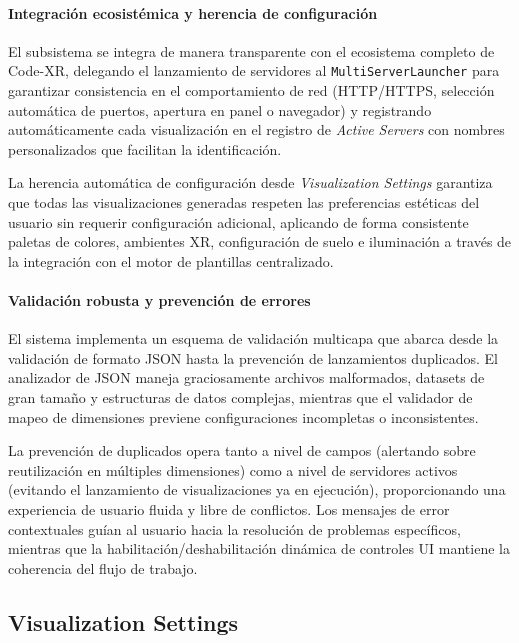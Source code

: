 \documentclass[a4paper, 12pt]{book}
\begin{document}
\paragraph{Integración ecosistémica y herencia de configuración}
El subsistema se integra de manera transparente con el ecosistema completo de Code-XR, delegando el lanzamiento de servidores al \texttt{MultiServerLauncher} para garantizar consistencia en el comportamiento de red (HTTP/HTTPS, selección automática de puertos, apertura en panel o navegador) y registrando automáticamente cada visualización en el registro de \emph{Active Servers} con nombres personalizados que facilitan la identificación.

La herencia automática de configuración desde \emph{Visualization Settings} garantiza que todas las visualizaciones generadas respeten las preferencias estéticas del usuario sin requerir configuración adicional, aplicando de forma consistente paletas de colores, ambientes XR, configuración de suelo e iluminación a través de la integración con el motor de plantillas centralizado.

\paragraph{Validación robusta y prevención de errores}
El sistema implementa un esquema de validación multicapa que abarca desde la validación de formato JSON hasta la prevención de lanzamientos duplicados. El analizador de JSON maneja graciosamente archivos malformados, datasets de gran tamaño y estructuras de datos complejas, mientras que el validador de mapeo de dimensiones previene configuraciones incompletas o inconsistentes.

La prevención de duplicados opera tanto a nivel de campos (alertando sobre reutilización en múltiples dimensiones) como a nivel de servidores activos (evitando el lanzamiento de visualizaciones ya en ejecución), proporcionando una experiencia de usuario fluida y libre de conflictos. Los mensajes de error contextuales guían al usuario hacia la resolución de problemas específicos, mientras que la habilitación/deshabilitación dinámica de controles UI mantiene la coherencia del flujo de trabajo.



\subsection{Visualization Settings}
\label{sec:visualization-settings}
\end{document}
